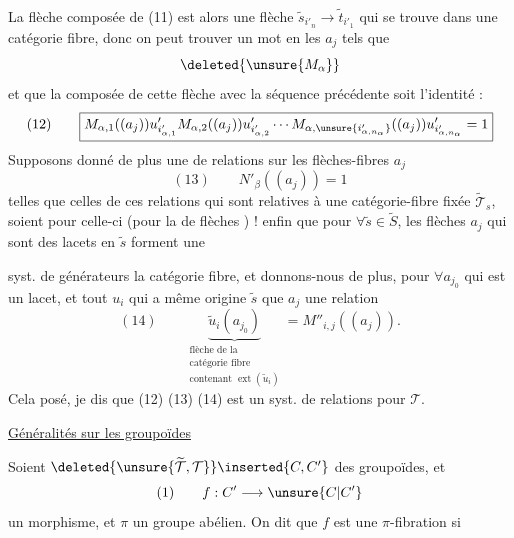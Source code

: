 La flèche composée de (11) est alors une flèche $\widetilde s_{i'_n}\longrightarrow\widetilde t_{i'_1}$ qui se trouve dans une catégorie fibre, donc  on peut trouver un mot  en les $a_j$ tels que
\[\deleted{\unsure{M_\alpha}}\]
et que la composée de  cette flèche avec la séquence précédente soit l'identité :
\[(12)\qquad\boxed{M_{\alpha,1}((a_j))u'_{i'_{\alpha,1}}M_{\alpha,2}((a_j))u'_{i'_{\alpha,2}}\cdots M_{\alpha,\unsure{i'_{\alpha,n_\alpha}}}((a_j))u'_{i'_{\alpha,n_\alpha}}=1}\]
Supposons donné de plus une  de relations sur les flèches-fibres $a_j$
\[(13)\qquad\boxed{N'_\beta((a_j))=1}\]
telles que celles de ces relations qui sont relatives à une catégorie-fibre fixée $\widetilde{\mathcal T}_s$, soient  pour celle-ci (pour la  de flèches ) !  enfin que pour $\forall\widetilde s\in\widetilde S$, les  flèches $a_j$ qui sont des lacets en $\widetilde s$ forment une

syst. de générateurs  la catégorie fibre, et donnons-nous de plus, pour $\forall a_{j_0}$ qui est un lacet, et tout $u_i$ qui a même origine $\widetilde s$ que $a_j$ une relation
\[(14)\qquad\boxed{\underbrace{\widetilde u_i(a_{j_0})}_{\substack{\text{flèche de la}\\\text{catégorie fibre}\\\text{contenant }\operatorname{ext}(\widetilde u_i)}}=M''_{i,j}((a_j))}.\]
Cela posé, je dis que (12) (13) (14) est un syst. de relations  pour $\mathcal T$.

\uline{Généralités sur les groupoïdes}

Soient $\deleted{\unsure{\widetilde{\mathcal T},\mathcal T}}\inserted{C,C'}$ des groupoïdes, et
\[(1)\qquad f:C'\longrightarrow\unsure{C|C'}\]
un morphisme, et $\pi$ un groupe abélien.
On dit que $f$ est une $\pi$-fibration  si

